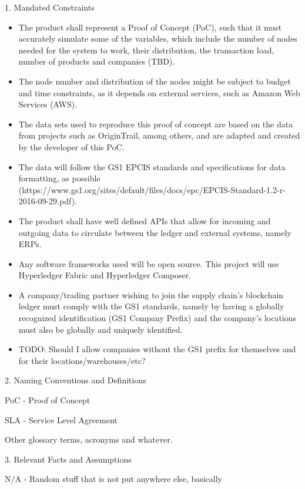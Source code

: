 {	1. Mandated Constraints
    \begin{itemize}
		\item The product shall represent a Proof of Concept (PoC), such that it must accurately simulate some of the variables, which include the number of nodes needed for the system to work, their distribution, the transaction load, number of products and companies (TBD).
		\item The node number and distribution of the nodes might be subject to budget and time constraints, as it depends on external services, such as Amazon Web Services (AWS).
		\item The data sets used to reproduce this proof of concept are based on the data from projects such as OriginTrail, among others, and are adapted and created by the developer of this PoC.
		\item The data will follow the GS1 EPCIS standards and specifications for data formatting, as possible (https://www.gs1.org/sites/default/files/docs/epc/EPCIS-Standard-1.2-r-2016-09-29.pdf).
		\item The product shall have well defined APIs that allow for incoming and outgoing data to circulate between the ledger and external systems, namely ERPs.
		\item Any software frameworks used will be open source. This project will use Hyperledger Fabric and Hyperledger Composer.
		\item A company/trading partner wishing to join the supply chain's blockchain ledger must comply with the GS1 standards, namely by having a globally recognized identification (GS1 Company Prefix) and the company's locations must also be globally and uniquely identified.
		\item TODO: Should I allow companies without the GS1 prefix for themselves and for their locations/warehouses/etc? 
        \end{itemize}
	2. Naming Conventions and Definitions
		\par PoC - Proof of Concept
		\par SLA - Service Level Agreement
		\par Other glossary terms, acronyms and whatever.
		
	3. Relevant Facts and Assumptions
		\par N/A - Random stuff that is not put anywhere else, basically
	
}
